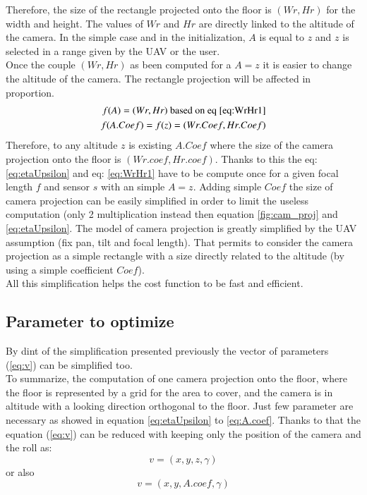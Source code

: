 Therefore, the size of the rectangle projected onto the floor is $(Wr,Hr)$ for the width and height. The values of $Wr$ and $Hr$ are directly linked to the altitude of the camera. In the simple case and in the initialization, $A$ is equal to $z$  and $z$ is selected in a range given by the UAV or the user. \\
Once the couple $(Wr,Hr)$ as been computed for a $A=z$ it is easier to change the altitude of the camera. The rectangle projection will be affected in proportion.
	\begin{equation}\label{eq:A.coef}
		\begin{split}
 		   	f(A)= (Wr,Hr) \text{ based on eq \ref{eq:WrHr1}}\\
    		f(A.Coef)=f(z)= (Wr.Coef,Hr.Coef)      
    	 \end{split} 
	\end{equation}
Therefore, to any altitude $z$ is existing $A.Coef$ where the size of the camera projection onto the floor is $(Wr.coef, Hr.coef)$. Thanks to this the eq: \ref{eq:etaUpsilon} and eq: \ref{eq:WrHr1} have to be compute once  for a given focal length $f$ and sensor $s$ with an simple $A=z$. Adding simple $Coef$ the size of camera projection can be easily simplified in order to limit the useless computation (only 2 multiplication instead then equation \ref{fig:cam_proj} and \ref{eq:etaUpsilon}.
The model of camera projection is greatly simplified by the UAV assumption (fix pan, tilt and focal length). That permits to consider the camera projection as a simple rectangle with a size directly related to the altitude (by using a simple coefficient $Coef$).\\
All this simplification helps the cost function to be fast and efficient. \\

\subsection{Parameter to optimize }\label{sec:parameterToOptimize}
By dint of the simplification presented previously the vector of parameters (\ref{eq:v}) can be simplified too.\\
To summarize,  the computation of  one camera  projection onto the floor, where the floor is represented by a grid for the area to cover, and the camera is in altitude with a looking direction orthogonal to the floor.  Just few parameter are necessary  as showed in equation  \ref{eq:etaUpsilon} %
to \ref{eq:A.coef}. Thanks to that the equation (\ref{eq:v}) can be reduced with keeping only the position of the camera and the roll as:
	\begin{equation}\label{eq:v2}
		v=(x,y,z,\gamma )
	\end{equation}
	or also
	\begin{equation}\label{eq:v2}
		v=(x,y,A.coef,\gamma )
	\end{equation}

